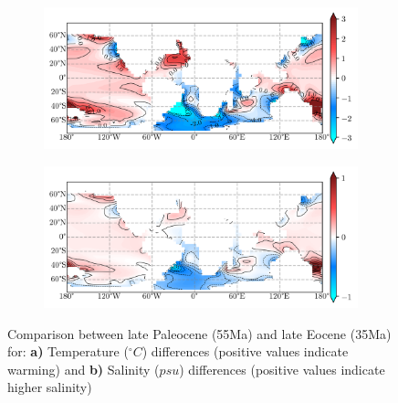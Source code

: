 \documentclass[a4paper]{article}
\begin{document}
\begin{figure}[H]
	\begin{subfigure}[b]{0.5\linewidth}
		\caption{}
		\label{fig:5535cooling}
		\includegraphics[width=\linewidth]{Paleo_eocene_55_35.png}
		
		
	\end{subfigure}
	\begin{subfigure}[b]{0.5\linewidth}
		\caption{}
		\label{fig:salt5535cooling}
		\includegraphics[width=\linewidth]{salt_55_35.png}
		
		
	\end{subfigure}
	\caption{ Comparison between late Paleocene (55Ma) and late Eocene (35Ma) for: \textbf{a)} Temperature ($^{\circ}C$) differences (positive values indicate warming) and  \textbf{b)} Salinity ($psu$) differences (positive values indicate higher salinity)}
\end{figure}
\end{document}
